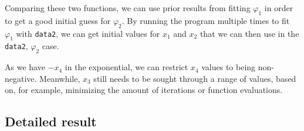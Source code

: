 \documentclass[12pt, a4paper]{article}
\begin{document}
Comparing these two functions, we can use prior results from fitting $\varphi_1$ in order to get a good initial guess for $\varphi_2$. By running the program multiple times to fit $\varphi_1$ with \texttt{data2}, we can get initial values for $x_1$ and $x_2$ that we can then use in the \texttt{data2}, $\varphi_2$ case.

As we have $-x_4$ in the exponential, we can restrict $x_4$ values to being non-negative. Meanwhile, $x_3$ still needs to be sought through a range of values, based on, for example, minimizing the amount of iterations or function evaluations.

\subsection{Detailed result}
\end{document}
